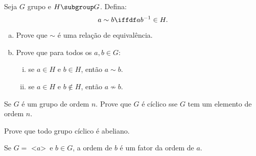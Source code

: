 \begin{exercise}
	Seja $G$ grupo e $H \subgroup G$. Defina:
	$$
		a \sim b \iffdf ab^{-1} \in H. 
	$$
	\begin{enumerate}[(a)]
		\item Prove que $\sim$ é uma relação de equivalência.
		\item Prove que para todos os $a,b \in G$:
			\begin{enumerate}[(i)]
				\item se $a \in H$ e $b \in H$, então $a \sim b$.
				\item se $a \in H$ e $b \notin H$, então $a \not\sim b$.
			\end{enumerate}
	\end{enumerate}
\end{exercise}

\begin{exercise}
	Se $G$ é um grupo de ordem $n$. Prove que $G$ é cíclico sse $G$ tem um elemento de ordem $n$.
\end{exercise}

\begin{exercise}
	Prove que todo grupo cíclico é abeliano.
\end{exercise}

\begin{exercise}
	Se $G =$ \textless $a$\textgreater\ e $b \in G$, a ordem de $b$ é um fator da ordem de $a$.
\end{exercise}

